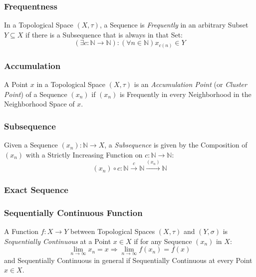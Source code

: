 \subsubsection{Frequentness}\label{sec:frequent}

In a Topological Space $(X, \tau)$, a Sequence is \emph{Frequently}
in an arbitrary Subset $Y \subseteq X$ if there is a Subsequence that
is always in that Set:
\[
  (\exists c : \mathbb{N} \rightarrow \mathbb{N})
  : (\forall n \in \mathbb{N}) x_{c(n)} \in Y
\]



\subsubsection{Accumulation}\label{sec:accumulation}

A Point $x$ in a Topological Space $(X, \tau)$ is an
\emph{Accumulation Point} (or \emph{Cluster Point}) of a Sequence
$(x_n)$ if $(x_n)$ is Frequently in every Neighborhood in the
Neighborhood Space of $x$.



\subsubsection{Subsequence}\label{sec:subsequence_topology}

Given a Sequence $(x_n) : \mathbb{N} \rightarrow X$, a
\emph{Subsequence} is given by the Composition of $(x_n)$ with a
Strictly Increasing Function on $c : \mathbb{N} \rightarrow
\mathbb{N}$:
\[
  (x_n) \circ c :
  \mathbb{N} \xrightarrow{c} \mathbb{N} \xrightarrow{(x_n)} \mathbb{N}
\]



\subsubsection{Exact Sequence}\label{sec:exact_sequence}

\subsubsection{Sequentially Continuous Function}
\label{sec:sequentially_continuous}

A Function $f : X \rightarrow Y$ between Topological Spaces $(X,
\tau)$ and $(Y, \sigma)$ is \emph{Sequentially Continuous} at a Point
$x \in X$ if for any Sequence $(x_n)$ in $X$:
\[
  \lim_{n \rightarrow \infty} x_n = x
  \Rightarrow \lim_{n \rightarrow \infty} f(x_n) = f(x)
\]
and Sequentially Continuous in general if Sequentially Continuous at
every Point $x \in X$.


